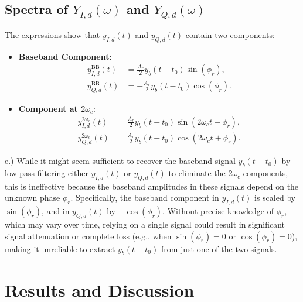 \documentclass[12pt, a4paper]{article}
\begin{document}
\subsection*{Spectra of \( Y_{I,d}(\omega) \) and \( Y_{Q,d}(\omega) \)}
The expressions show that \( y_{I,d}(t) \) and \( y_{Q,d}(t) \) contain two components:
\begin{itemize}
    \item \textbf{Baseband Component}:
    \begin{align*}
    y_{I,d}^{\text{BB}}(t) &= \tfrac{A_r}{2} y_b(t - t_0) \sin(\phi_r), \\
    y_{Q,d}^{\text{BB}}(t) &= -\tfrac{A_r}{2} y_b(t - t_0) \cos(\phi_r).
    \end{align*}
    \item \textbf{Component at \( 2\omega_c \)}:
    \begin{align*}
    y_{I,d}^{2\omega_c}(t) &= \tfrac{A_r}{2} y_b(t - t_0) \sin(2\omega_c t + \phi_r), \\
    y_{Q,d}^{2\omega_c}(t) &= \tfrac{A_r}{2} y_b(t - t_0) \cos(2\omega_c t + \phi_r).
    \end{align*}
\end{itemize}

e.)
While it might seem sufficient to recover the baseband signal $y_b(t - t_0)$ by low-pass filtering either $y_{I,d}(t)$ or $y_{Q,d}(t)$ to eliminate the $2\omega_c$ components, this is ineffective because the baseband amplitudes in these signals depend on the unknown phase $\phi_r$. Specifically, the baseband component in $y_{I,d}(t)$ is scaled by $\sin(\phi_r)$, and in $y_{Q,d}(t)$ by $-\cos(\phi_r)$. Without precise knowledge of $\phi_r$, which may vary over time, relying on a single signal could result in significant signal attenuation or complete loss (e.g., when $\sin(\phi_r) = 0$ or $\cos(\phi_r) = 0$), making it unreliable to extract $y_b(t - t_0)$ from just one of the two signals.


\section{Results and Discussion}
\end{document}
